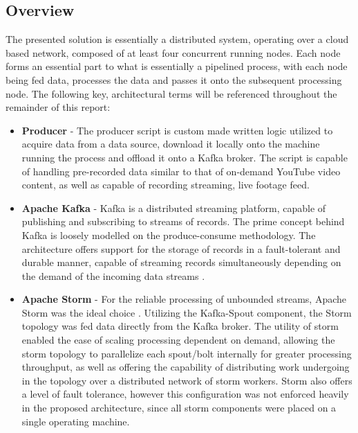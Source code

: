 \documentclass[10pt,conference]{IEEEtran}
\begin{document}
\subsection{Overview}
The presented solution is essentially a distributed system, operating over a cloud based network, composed of at least four concurrent running nodes. Each node forms an essential part to what is essentially a pipelined process, with each node being fed data, processes the data and passes it onto the subsequent processing node. The following key, architectural terms will be referenced throughout the remainder of this report:
\begin{itemize}
    \item \textbf{Producer} - The producer script is custom made written logic utilized to acquire data from a data source, download it locally onto the machine running the process and offload it onto a Kafka \cite{Kafka} broker. The script is capable of handling pre-recorded data similar to that of on-demand YouTube video content, as well as capable of recording streaming, live footage feed.

    \item \textbf{Apache Kafka} - Kafka is a distributed streaming platform, capable of publishing and subscribing to streams of records. The prime concept behind Kafka is loosely modelled on the produce-consume methodology. The architecture offers support for the storage of records in a fault-tolerant and durable manner, capable of streaming records simultaneously depending on the demand of the incoming data streams \cite{Kafka}.

    \item \textbf{Apache Storm} - For the reliable processing of unbounded streams, Apache Storm was the ideal choice \cite{Storm}. Utilizing the Kafka-Spout component, the Storm topology was fed data directly from the Kafka broker. The utility of storm enabled the ease of scaling processing dependent on demand, allowing the storm topology to parallelize each spout/bolt internally for greater processing throughput, as well as offering the capability of distributing work undergoing in the topology over a distributed network of storm workers. Storm also offers a level of fault tolerance, however this configuration was not enforced heavily in the proposed architecture, since all storm components were placed on a single operating machine.


\end{itemize}
\end{document}

